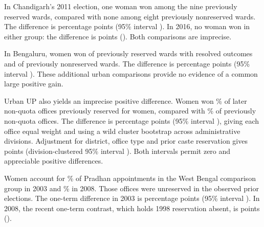 In Chandigarh's 2011 election, one woman won among the nine previously reserved wards, compared with none among eight previously nonreserved wards. The difference is \appChandigarhEstimate{} percentage points (95\% interval \appChandigarhInterval{}). In 2016, no woman won in either group: the difference is \appChandigarhLaterEstimate{} points (\appChandigarhLaterInterval{}). Both comparisons are imprecise.

In Bengaluru, women won \appBengaluruTreatedWomen{} of \appBengaluruTreatedN{} previously reserved wards with resolved outcomes and \appBengaluruControlWomen{} of \appBengaluruControlN{} previously nonreserved wards. The difference is \appBengaluruEstimate{} percentage points (95\% interval \appBengaluruInterval{}). These additional urban comparisons provide no evidence of a common large positive gain.

Urban UP also yields an imprecise positive difference. Women won \appUpUrbanQuotaShare{}\% of later non-quota offices previously reserved for women, compared with \appUpUrbanNonquotaShare{}\% of previously non-quota offices. The difference is \appUpUrbanEstimate{} percentage points (95\% interval \appUpUrbanInterval{}), giving each office equal weight and using a wild cluster bootstrap across \appUpUrbanDivisions{} administrative divisions. Adjustment for district, office type and prior caste reservation gives \appUpUrbanAdjusted{} points (division-clustered 95\% interval \appUpUrbanAdjustedInterval{}). Both intervals permit zero and appreciable positive differences.

Women account for \appWbBaselineEarly{}\% of Pradhan appointments in the West Bengal comparison group in 2003 and \appWbBaselineLater{}\% in 2008. Those offices were unreserved in the observed prior elections. The one-term difference in 2003 is \appWbPublishedA{} percentage points (95\% interval \appWbPublishedAInterval{}). In 2008, the recent one-term contrast, which holds 1998 reservation absent, is \appWbPublishedB{} points (\appWbPublishedBInterval{}).

